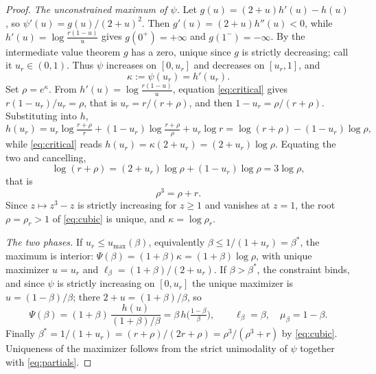 \documentclass[10pt,a4paper]{amsart}
\begin{document}
\begin{proof}
\emph{The unconstrained maximum of $\psi$.} Let $g(u)=(2+u)h'(u)-h(u)$, so $\psi'(u)=g(u)/(2+u)^2$. Then $g'(u)=(2+u)h''(u)<0$, while $h'(u)=\log\frac{r(1-u)}{u}$ gives $g(0^{+})=+\infty$ and $g(1^{-})=-\infty$. By the intermediate value theorem $g$ has a zero, unique since $g$ is strictly decreasing; call it $u_r\in(0,1)$. Thus $\psi$ increases on $[0,u_r]$ and decreases on $[u_r,1]$, and
\begin{equation}\label{eq:critical}
\kappa:=\psi(u_r)=h'(u_r).
\end{equation}
Set $\rho=e^{\kappa}$. From $h'(u)=\log\frac{r(1-u)}{u}$, equation \eqref{eq:critical} gives $r(1-u_r)/u_r=\rho$, that is $u_r=r/(r+\rho)$, and then $1-u_r=\rho/(r+\rho)$. Substituting into $h$,
\[
h(u_r)=u_r\log\tfrac{r+\rho}{r}+(1-u_r)\log\tfrac{r+\rho}{\rho}+u_r\log r
=\log(r+\rho)-(1-u_r)\log\rho ,
\]
while \eqref{eq:critical} reads $h(u_r)=\kappa(2+u_r)=(2+u_r)\log\rho$. Equating the two and cancelling,
\[
\log(r+\rho)=(2+u_r)\log\rho+(1-u_r)\log\rho=3\log\rho,
\]
that is
\begin{equation}\label{eq:cubic}
\rho^{3}=\rho+r .
\end{equation}
Since $z\mapsto z^{3}-z$ is strictly increasing for $z\ge1$ and vanishes at $z=1$, the root $\rho=\rho_r>1$ of \eqref{eq:cubic} is unique, and $\kappa=\log\rho_r$.

\emph{The two phases.} If $u_r\le u_{\max}(\beta)$, equivalently $\beta\le1/(1+u_r)=\beta^{*}$, the maximum is interior: $\Psi(\beta)=(1+\beta)\kappa=(1+\beta)\log\rho$, with unique maximizer $u=u_r$ and $\ell_\beta=(1+\beta)/(2+u_r)$. If $\beta>\beta^{*}$, the constraint binds, and since $\psi$ is strictly increasing on $[0,u_r]$ the unique maximizer is $u=(1-\beta)/\beta$; there $2+u=(1+\beta)/\beta$, so
\[
\Psi(\beta)=(1+\beta)\,\frac{h(u)}{(1+\beta)/\beta}=\beta\,h\Big(\tfrac{1-\beta}\beta\Big),
\qquad
\ell_\beta=\beta,\quad \mu_\beta=1-\beta .
\]
Finally $\beta^{*}=1/(1+u_r)=(r+\rho)/(2r+\rho)=\rho^{3}/(\rho^{3}+r)$ by \eqref{eq:cubic}. Uniqueness of the maximizer follows from the strict unimodality of $\psi$ together with \eqref{eq:partials}.
\end{proof}
\end{document}

